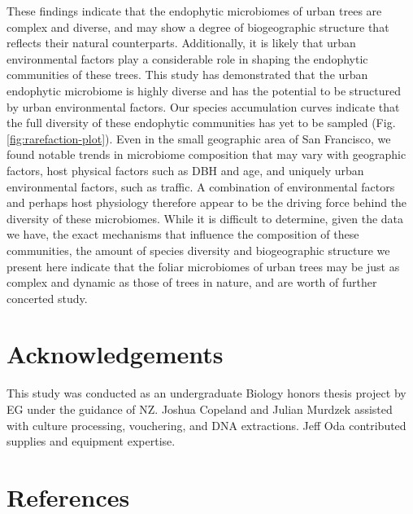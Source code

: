 \documentclass[fleqn,10pt,lineno]{wlpeerj} %
\begin{document}
These findings indicate that the endophytic microbiomes of urban trees are complex and diverse, and may show a degree of biogeographic structure that reflects their natural counterparts. Additionally, it is likely that urban environmental factors play a considerable role in shaping the endophytic communities of these trees. This study has demonstrated that the urban endophytic microbiome is highly diverse and has the potential to be structured by urban environmental factors. Our species accumulation curves indicate that the full diversity of these endophytic communities has yet to be sampled (Fig. \ref{fig:rarefaction-plot}). Even in the small geographic area of San Francisco, we found notable trends in microbiome composition that may vary with geographic factors, host physical factors such as DBH and age, and uniquely urban environmental factors, such as traffic. A combination of environmental factors and perhaps host physiology therefore appear to be the driving force behind the diversity of these microbiomes. While it is difficult to determine, given the data we have, the exact mechanisms that influence the composition of these communities, the amount of species diversity and biogeographic structure we present here indicate that the foliar microbiomes of urban trees may be just as complex and dynamic as those of trees in nature, and are worth of further concerted study.

\hypertarget{acknowledgements}{%
\section*{Acknowledgements}\label{acknowledgements}}

This study was conducted as an undergraduate Biology honors thesis project by EG under the guidance of NZ. Joshua Copeland and Julian Murdzek assisted with culture processing, vouchering, and DNA extractions. Jeff Oda contributed supplies and equipment expertise.

\hypertarget{references}{%
\section*{References}\label{references}}
\end{document}
